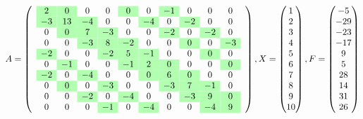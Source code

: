 $$ A=\left(\quad\begin{matrix}
\cellcolor{green!30}2 & \cellcolor{green!30}0 & 0 & 0 & \cellcolor{green!30}0 & 0 & \cellcolor{green!30}-1 & 0 & 0 & 0 \\
\cellcolor{green!30}-3 & \cellcolor{green!30}13 & \cellcolor{green!30}-4 & 0 & 0 & \cellcolor{green!30}-4 & 0 & \cellcolor{green!30}-2 & 0 & 0 \\
0 & \cellcolor{green!30}0 & \cellcolor{green!30}7 & \cellcolor{green!30}-3 & 0 & 0 & \cellcolor{green!30}-2 & 0 & \cellcolor{green!30}-2 & 0 \\
0 & 0 & \cellcolor{green!30}-3 & \cellcolor{green!30}8 & \cellcolor{green!30}-2 & 0 & 0 & \cellcolor{green!30}0 & 0 & \cellcolor{green!30}-3 \\
\cellcolor{green!30}-2 & 0 & 0 & \cellcolor{green!30}-2 & \cellcolor{green!30}5 & \cellcolor{green!30}-1 & 0 & 0 & \cellcolor{green!30}0 & 0 \\
0 & \cellcolor{green!30}-1 & 0 & 0 & \cellcolor{green!30}-1 & \cellcolor{green!30}2 & \cellcolor{green!30}0 & 0 & 0 & \cellcolor{green!30}0 \\
\cellcolor{green!30}-2 & 0 & \cellcolor{green!30}-4 & 0 & 0 & \cellcolor{green!30}0 & \cellcolor{green!30}6 & \cellcolor{green!30}0 & 0 & 0 \\
0 & \cellcolor{green!30}0 & 0 & \cellcolor{green!30}-3 & 0 & 0 & \cellcolor{green!30}-3 & \cellcolor{green!30}7 & \cellcolor{green!30}-1 & 0 \\
0 & 0 & \cellcolor{green!30}-2 & 0 & \cellcolor{green!30}-4 & 0 & 0 & \cellcolor{green!30}-3 & \cellcolor{green!30}9 & \cellcolor{green!30}0 \\
0 & 0 & 0 & \cellcolor{green!30}-1 & 0 & \cellcolor{green!30}-4 & 0 & 0 & \cellcolor{green!30}-4 & \cellcolor{green!30}9 
\end{matrix}\quad\right), X=\begin{pmatrix}1 \\
2 \\
3 \\
4 \\
5 \\
6 \\
7 \\
8 \\
9 \\
10 
\end{pmatrix}, F=\begin{pmatrix}-5 \\
-29 \\
-23 \\
-17 \\
9 \\
5 \\
28 \\
14 \\
31 \\
26 
\end{pmatrix} $$

